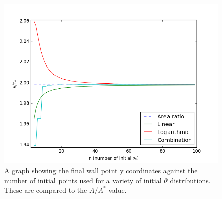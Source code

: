 \documentclass[10pt,a4paper]{article}
\begin{document}
\begin{figure}[!htb]
\centering
\includegraphics[scale=0.75]{accuracy.png}
\caption{A graph showing the final wall point y coordinates against the number of initial points used for a variety of initial $\theta$ distributions. These are compared to the $A/A^{*}$ value.}
\label{fig:y_coordinates}
\end{figure}
\end{document}
